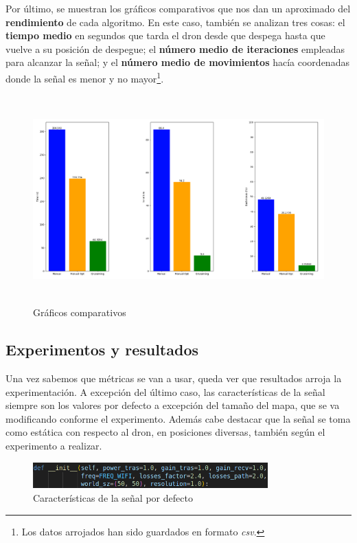 Por último, se muestran los gráficos comparativos que nos dan un aproximado del \textbf{rendimiento} de cada algoritmo. En este caso, también se analizan tres cosas: el \textbf{tiempo medio} en segundos que tarda el dron desde que despega hasta que vuelve a su posición de despegue; el \textbf{número medio de iteraciones} empleadas para alcanzar la señal; y el \textbf{número medio de movimientos} hacía coordenadas donde la señal es menor y no mayor\footnote[4]{Los datos arrojados han sido guardados en formato \emph{csv}.}.\\

\begin{figure} [H]
    \begin{center}
    \includegraphics[height=8cm]{imagenes/cap4/15_avg_graphs.png}
    \end{center}
    \caption[Gráficos comparativos]{Gráficos comparativos}
    \label{fig:compare_graph}
\end{figure}

\subsection{Experimentos y resultados}
\label{subsec:experimentos_resultados}

Una vez sabemos que métricas se van a usar, queda ver que resultados arroja la experimentación. A excepción del último caso, las características de la señal siempre son los valores por defecto a excepción del tamaño del mapa, que se va modificando conforme el experimento. Además cabe destacar que la señal se toma como estática con respecto al dron, en posiciones diversas, también según el experimento a realizar.\\

\begin{figure} [H]
    \begin{center}
    \includegraphics[height=1cm]{imagenes/cap4/16_default_values.png}
    \end{center}
    \caption[Características de la señal por defecto]{Características de la señal por defecto}
    \label{fig:compare_graph}
\end{figure}

